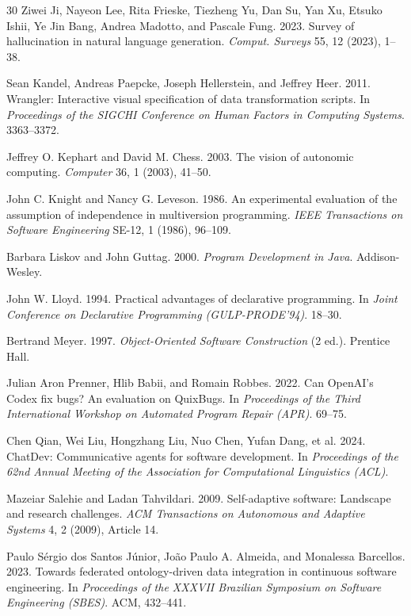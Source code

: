 \documentclass[sigconf,nonacm]{acmart}
\begin{document}
\begin{thebibliography}{30}
Ziwei Ji, Nayeon Lee, Rita Frieske, Tiezheng Yu, Dan Su, Yan Xu, Etsuko Ishii, Ye Jin Bang, Andrea Madotto, and Pascale Fung. 2023.
Survey of hallucination in natural language generation.
\textit{Comput. Surveys} 55, 12 (2023), 1--38.

Sean Kandel, Andreas Paepcke, Joseph Hellerstein, and Jeffrey Heer. 2011.
Wrangler: Interactive visual specification of data transformation scripts.
In \textit{Proceedings of the SIGCHI Conference on Human Factors in Computing Systems}. 3363--3372.

Jeffrey O. Kephart and David M. Chess. 2003.
The vision of autonomic computing.
\textit{Computer} 36, 1 (2003), 41--50.

John C. Knight and Nancy G. Leveson. 1986.
An experimental evaluation of the assumption of independence in multiversion programming.
\textit{IEEE Transactions on Software Engineering} SE-12, 1 (1986), 96--109.

Barbara Liskov and John Guttag. 2000.
\textit{Program Development in Java}.
Addison-Wesley.

John W. Lloyd. 1994.
Practical advantages of declarative programming.
In \textit{Joint Conference on Declarative Programming (GULP-PRODE'94)}. 18--30.

Bertrand Meyer. 1997.
\textit{Object-Oriented Software Construction} (2 ed.).
Prentice Hall.

Julian Aron Prenner, Hlib Babii, and Romain Robbes. 2022.
Can OpenAI's Codex fix bugs? An evaluation on QuixBugs.
In \textit{Proceedings of the Third International Workshop on Automated Program Repair (APR)}. 69--75.

Chen Qian, Wei Liu, Hongzhang Liu, Nuo Chen, Yufan Dang, et al. 2024.
ChatDev: Communicative agents for software development.
In \textit{Proceedings of the 62nd Annual Meeting of the Association for Computational Linguistics (ACL)}.

Mazeiar Salehie and Ladan Tahvildari. 2009.
Self-adaptive software: Landscape and research challenges.
\textit{ACM Transactions on Autonomous and Adaptive Systems} 4, 2 (2009), Article 14.

Paulo S\'ergio dos Santos J\'unior, Jo\~ao Paulo A. Almeida, and Monalessa Barcellos. 2023.
Towards federated ontology-driven data integration in continuous software engineering.
In \textit{Proceedings of the XXXVII Brazilian Symposium on Software Engineering (SBES)}. ACM, 432--441.


\end{thebibliography}
\end{document}
